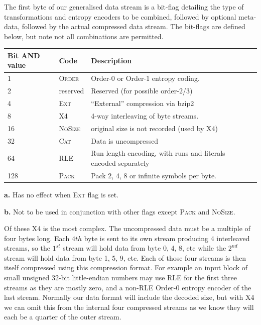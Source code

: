 \documentclass[a4paper]{article}
\begin{document}
The first byte of our generalised data stream is a bit-flag detailing the type of transformations and entropy encoders to be combined, followed by optional meta-data, followed by the actual compressed data stream.
The bit-flags are defined below, but note not all combinations are permitted.

\begin{threeparttable}[t]
\begin{tabular}{llll}
\hline
\textbf{Bit AND value} & \textbf{Code} & \textbf{Description} \\
\hline
1 & \textsc{Order}\tnote{\textbf{a}} & Order-0 or Order-1 entropy coding. \\
2 & reserved & Reserved (for possible order-2/3)\\
4 & \textsc{Ext} & ``External'' compression via bzip2\\
8 & \textsc{X4}\tnote{\textbf{b}} & 4-way interleaving of byte streams.\\
16 & \textsc{NoSize} & original size is not recorded (used by X4)\\
32 & \textsc{Cat}\tnote{\textbf{b}} & Data is uncompressed\\
64 & \textsc{RLE}\tnote{\textbf{a}} & Run length encoding, with runs and literals encoded separately\\
128 & \textsc{Pack} & Pack 2, 4, 8 or infinite symbols per byte.\\
\hline
\end{tabular}
\begin{tablenotes}
\item{\textbf{a.}} Has no effect when \textsc{Ext} flag is set.
\item{\textbf{b.}} Not to be used in conjunction with other flags
  except \textsc{Pack} and \textsc{NoSize}.
\end{tablenotes}
\end{threeparttable}

Of these X4 is the most complex.
The uncompressed data must be a multiple of four bytes long.
Each $4{th}$ byte is sent to its own stream producing 4 interleaved streams, so the $1^{st}$ stream will hold data from byte 0, 4, 8, etc while the $2^{nd}$ stream will hold data from byte 1, 5, 9, etc.
Each of those four streams is then itself compressed using this compression format.
For example an input block of small unsigned 32-bit little-endian numbers may use RLE for the first three streams as they are mostly zero, and a non-RLE Order-0 entropy encoder of the last stream.
Normally our data format will include the decoded size, but with X4 we can omit this from the internal four compressed streams as we know they will each be a quarter of the outer stream.
\end{document}
